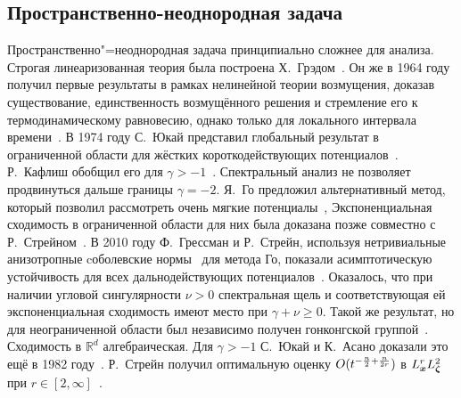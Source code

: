 \subsection{Пространственно-неоднородная задача}

Пространственно"=неоднородная задача принципиально сложнее для анализа.
Строгая линеаризованная теория была построена Х.~Грэдом~\cite{Grad1963b}.
Он же в 1964 году получил первые результаты в рамках нелинейной теории возмущения, доказав
существование, единственность возмущённого решения и стремление его к термодинамическому равновесию,
однако только для локального интервала времени~\cite{Grad1965}.
В 1974 году С.~Юкай представил глобальный результат в ограниченной области
для жёстких короткодействующих потенциалов~\cite{Ukai1974}.
Р.~Кафлиш обобщил его для \(\gamma>-1\)~\cite{Caflisch1980b}.
Спектральный анализ не позволяет продвинуться дальше границы \(\gamma=-2\).
Я.~Го предложил альтернативный метод, который позволил рассмотреть очень мягкие потенциалы~\cite{Guo2003},
Экспоненциальная сходимость в ограниченной области для них была доказана позже совместно с Р.~Стрейном~\cite{Strain2008}.
В 2010 году Ф.~Грессман и Р.~Стрейн, используя нетривиальные анизотропные cоболевские нормы~\cite{Mouhot2007} для метода Го,
показали асимптотическую устойчивость для всех дальнодействующих потенциалов~\cite{Strain2011}.
Оказалось, что при наличии угловой сингулярности \(\nu>0\) спектральная щель и
соответствующая ей экспоненциальная сходимость имеют место при \(\gamma+\nu\geq0\).
Такой же результат, но для неограниченной области был независимо получен
гонконгской группой~\cite{Alexandre2012soft, Alexandre2011hard, Alexandre2011properties}.
Сходимость в \(\mathbb{R}^d\) алгебраическая. Для \(\gamma>-1\) С.~Юкай и К.~Асано доказали это ещё в 1982 году~\cite{Ukai1982}.
Р.~Стрейн получил оптимальную оценку \(O(t^{-\frac{n}2+\frac{n}{2r}})\) в \(L^r_{\boldsymbol{x}} L^2_{\boldsymbol{\zeta}}\) при \(r\in[2,\infty]\)~\cite{Strain2012}.

